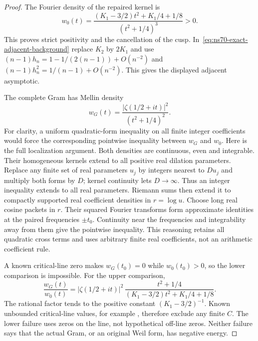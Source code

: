 \begin{proof}
The Fourier density of the repaired kernel is
\begin{equation}
 w_0(t)=\frac{(K_1-3/2)t^2+K_1/4+1/8}{(t^2+1/4)^3}>0.
 \label{eq:ns70-repaired-symbol}
\end{equation}
This proves strict positivity and the cancellation of the cusp.
In~\eqref{eq:ns70-exact-adjacent-background} replace $K_2$ by
$2K_1$ and use
$(n-1)h_n=1-1/(2(n-1))+O(n^{-2})$ and
$(n-1)h_n^2=1/(n-1)+O(n^{-2})$.
This gives the displayed adjacent asymptotic.

The complete Gram has Mellin density
\[
 w_G(t)=\frac{|\zeta(1/2+it)|^2}{(t^2+1/4)^2}.
\]
For clarity, a uniform quadratic-form inequality on all finite integer
coefficients would force the corresponding pointwise inequality between
$w_G$ and $w_0$. Here is the full localization argument. Both densities
are continuous, even and integrable. Their homogeneous kernels extend
to all positive real dilation parameters. Replace any finite set of real
parameters $u_j$ by integers nearest to $D u_j$ and multiply both forms
by $D$; kernel continuity lets $D\to\infty$. Thus an integer inequality
extends to all real parameters. Riemann sums then extend it to compactly
supported real coefficient densities in $r=\log u$. Choose long real
cosine packets in $r$. Their squared Fourier transforms form approximate
identities at the paired frequencies $\pm t_0$. Continuity near the
frequencies and integrability away from them give the pointwise inequality.
This reasoning retains all quadratic cross terms and uses arbitrary
finite real coefficients, not an arithmetic coefficient rule.

A known critical-line zero makes $w_G(t_0)=0$ while $w_0(t_0)>0$,
so the lower comparison is impossible. For the upper comparison,
\[
 \frac{w_G(t)}{w_0(t)}
 =|\zeta(1/2+it)|^2\,
   \frac{t^2+1/4}{(K_1-3/2)t^2+K_1/4+1/8}.
\]
The rational factor tends to the positive constant $(K_1-3/2)^{-1}$.
Known unbounded critical-line values, for example
\cite[Theorem 1]{Soundararajan2008}, therefore exclude any finite $C$.
The lower failure uses zeros on the line, not hypothetical off-line zeros.
Neither failure says that the actual Gram, or an original Weil form, has
negative energy.
\end{proof}

